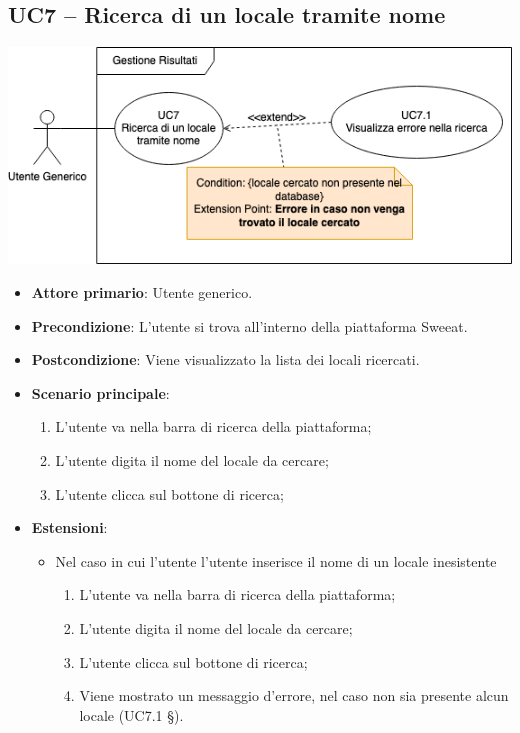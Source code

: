 \subsection{UC7 – Ricerca di un locale tramite nome}
\begin{center}
\includegraphics[scale=0.5]{UC_images/UC7.png} 
\end{center}
\begin{itemize}
    \item \textbf{Attore primario}: Utente generico.
    \item \textbf{Precondizione}: L'utente si trova all’interno della piattaforma Sweeat.
    \item \textbf{Postcondizione}: Viene visualizzato la lista dei locali ricercati.
    \item \textbf{Scenario principale}: 
    \begin{enumerate}
        \item L’utente va nella barra di ricerca della piattaforma;
        \item L’utente digita il nome del locale da cercare;
        \item L’utente clicca sul bottone di ricerca;
    \end{enumerate}
    \item \textbf{Estensioni}:
    \begin{itemize}
        \item Nel caso in cui l’utente l’utente inserisce il nome di un locale inesistente
	\begin{enumerate}  
		\item L’utente va nella barra di ricerca della piattaforma;
        \item L’utente digita il nome del locale da cercare;
        \item L’utente clicca sul bottone di ricerca; 
        \item Viene mostrato un messaggio d'errore, nel caso non sia presente alcun locale (UC7.1 §).
    \end{enumerate}
    \end{itemize}    
\end{itemize}

